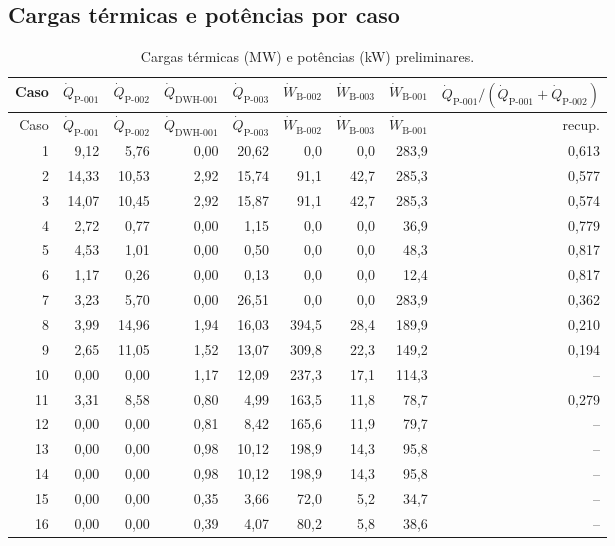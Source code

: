 \documentclass[11pt,a4paper]{article}
\numberwithin{equation}{section}
\numberwithin{table}{section}
\numberwithin{figure}{section}
\begin{document}
\subsection{Cargas térmicas e potências por caso}
{\footnotesize\setlength{\tabcolsep}{4pt}\begin{longtable}{rrrrrrrrr}
\caption{Cargas térmicas (\si{\mega\watt}) e potências (\si{\kilo\watt}) preliminares.}\label{tab:energia}\\\toprule
Caso & $\dot Q_{\mbox{P-001}}$ & $\dot Q_{\mbox{P-002}}$ & $\dot Q_{\mbox{DWH-001}}$ & $\dot Q_{\mbox{P-003}}$ & $\dot W_{\mbox{B-002}}$ & $\dot W_{\mbox{B-003}}$ & $\dot W_{\mbox{B-001}}$ & $\dot Q_{\mbox{P-001}}/(\dot Q_{\mbox{P-001}}+\dot Q_{\mbox{P-002}})$\\\midrule\endfirsthead
\toprule Caso & $\dot Q_{\mbox{P-001}}$ & $\dot Q_{\mbox{P-002}}$ & $\dot Q_{\mbox{DWH-001}}$ & $\dot Q_{\mbox{P-003}}$ & $\dot W_{\mbox{B-002}}$ & $\dot W_{\mbox{B-003}}$ & $\dot W_{\mbox{B-001}}$ & recup.\\\midrule\endhead

1 & 9,12 & 5,76 & 0,00 & 20,62 & 0,0 & 0,0 & 283,9 & 0,613\\
2 & 14,33 & 10,53 & 2,92 & 15,74 & 91,1 & 42,7 & 285,3 & 0,577\\
3 & 14,07 & 10,45 & 2,92 & 15,87 & 91,1 & 42,7 & 285,3 & 0,574\\
4 & 2,72 & 0,77 & 0,00 & 1,15 & 0,0 & 0,0 & 36,9 & 0,779\\
5 & 4,53 & 1,01 & 0,00 & 0,50 & 0,0 & 0,0 & 48,3 & 0,817\\
6 & 1,17 & 0,26 & 0,00 & 0,13 & 0,0 & 0,0 & 12,4 & 0,817\\
7 & 3,23 & 5,70 & 0,00 & 26,51 & 0,0 & 0,0 & 283,9 & 0,362\\
8 & 3,99 & 14,96 & 1,94 & 16,03 & 394,5 & 28,4 & 189,9 & 0,210\\
9 & 2,65 & 11,05 & 1,52 & 13,07 & 309,8 & 22,3 & 149,2 & 0,194\\
10 & 0,00 & 0,00 & 1,17 & 12,09 & 237,3 & 17,1 & 114,3 & --\\
11 & 3,31 & 8,58 & 0,80 & 4,99 & 163,5 & 11,8 & 78,7 & 0,279\\
12 & 0,00 & 0,00 & 0,81 & 8,42 & 165,6 & 11,9 & 79,7 & --\\
13 & 0,00 & 0,00 & 0,98 & 10,12 & 198,9 & 14,3 & 95,8 & --\\
14 & 0,00 & 0,00 & 0,98 & 10,12 & 198,9 & 14,3 & 95,8 & --\\
15 & 0,00 & 0,00 & 0,35 & 3,66 & 72,0 & 5,2 & 34,7 & --\\
16 & 0,00 & 0,00 & 0,39 & 4,07 & 80,2 & 5,8 & 38,6 & --\\
\bottomrule\end{longtable}}
\end{document}
